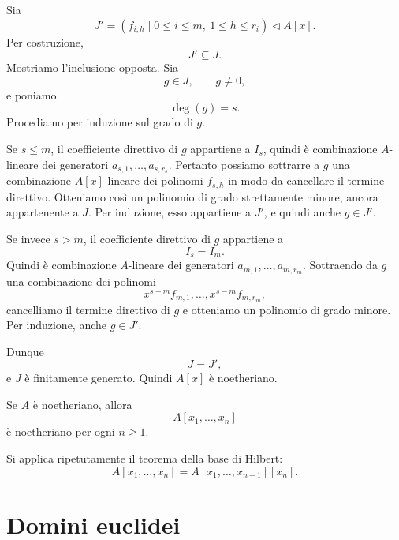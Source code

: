 \documentclass[a4paper]{article}
\begin{document}
\begin{radioactive}
\begin{snippetproof}{}
    Sia
    \[
        J'
        =
        (f_{i,h}\mid 0\leq i\leq m,\ 1\leq h\leq r_i)
        \triangleleft A[x].
    \]
    Per costruzione,
    \[
        J'\subseteq J.
    \]
    Mostriamo l'inclusione opposta. Sia
    \[
        g\in J,
        \qquad
        g\neq 0,
    \]
    e poniamo
    \[
        \deg(g)=s.
    \]
    Procediamo per induzione sul grado di \(g\).

    Se \(s\leq m\), il coefficiente direttivo di \(g\) appartiene a \(I_s\), quindi è combinazione \(A\)-lineare dei generatori \(a_{s,1},\ldots,a_{s,r_s}\). Pertanto possiamo sottrarre a \(g\) una combinazione \(A[x]\)-lineare dei polinomi \(f_{s,h}\) in modo da cancellare il termine direttivo. Otteniamo così un polinomio di grado strettamente minore, ancora appartenente a \(J\). Per induzione, esso appartiene a \(J'\), e quindi anche \(g\in J'\).

    Se invece \(s>m\), il coefficiente direttivo di \(g\) appartiene a
    \[
        I_s=I_m.
    \]
    Quindi è combinazione \(A\)-lineare dei generatori \(a_{m,1},\ldots,a_{m,r_m}\). Sottraendo da \(g\) una combinazione dei polinomi
    \[
        x^{s-m}f_{m,1},\ldots,x^{s-m}f_{m,r_m},
    \]
    cancelliamo il termine direttivo di \(g\) e otteniamo un polinomio di grado minore. Per induzione, anche \(g\in J'\).

    Dunque
    \[
        J=J',
    \]
    e \(J\) è finitamente generato.
    Quindi \(A[x]\) è noetheriano.
\end{snippetproof}
\end{radioactive}

\begin{radioactive}
\begin{snippetcorollary}{}
    Se \(A\) è noetheriano, allora
    \[
        A[x_1,\ldots,x_n]
    \]
    è noetheriano per ogni \(n\geq 1\).
\end{snippetcorollary}
\end{radioactive}

\begin{radioactive}
\begin{snippetproof}{}
    Si applica ripetutamente il teorema della base di Hilbert:
    \[
        A[x_1,\ldots,x_n]
        =
        A[x_1,\ldots,x_{n-1}][x_n].
    \]
\end{snippetproof}
\end{radioactive}

\section{Domini euclidei}
\end{document}
